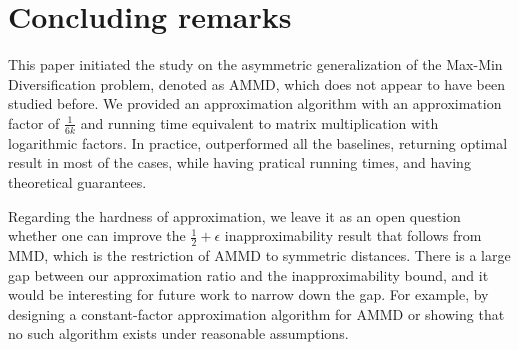 \section{Concluding remarks}\label{sec:conclusions}
This paper initiated the study on the asymmetric generalization of the Max-Min
Diversification problem, denoted as AMMD, which does not appear to have been
studied before. We provided an approximation algorithm with an approximation
factor of $\frac{1}{6k}$ and running time equivalent to matrix multiplication
with logarithmic factors. In practice, \algbacb{} outperformed all the baselines, returning optimal result in most of the cases,
while having pratical running times, and having theoretical guarantees.

Regarding the hardness of approximation, we leave it
as an open question whether one can improve the $\frac{1}{2}+\epsilon$
inapproximability result that follows from MMD, which is the restriction of
AMMD to symmetric distances. There is a large gap between our approximation
ratio and the inapproximability bound, and it would be interesting for future
work to narrow down the gap.
For example, by designing a constant-factor approximation algorithm for AMMD or showing that no such algorithm exists under reasonable assumptions.

